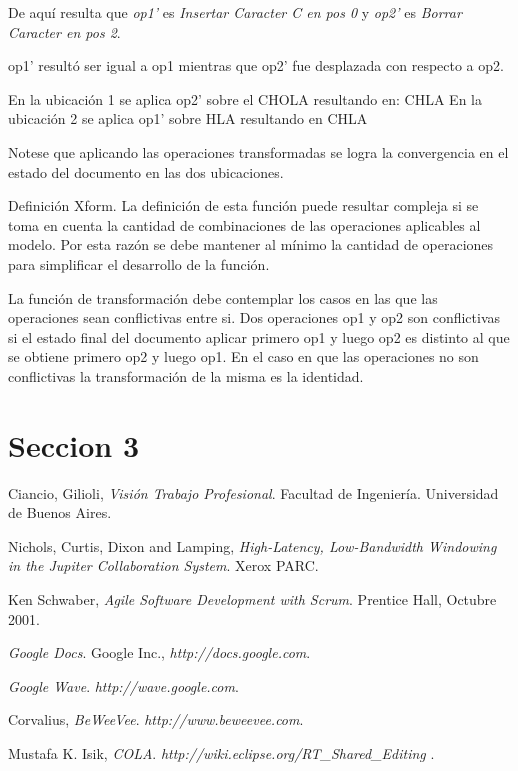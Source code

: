\documentclass[12pt,a4paper]{article}
\begin{document}
	De aquí resulta que \textit{op1’} es \textit{Insertar Caracter C en pos 0} y \textit{op2’} es 
	\textit{Borrar Caracter en pos 2}.

op1’ resultó ser igual a op1 mientras que op2’ fue desplazada con respecto a op2.

En la ubicación 1 se aplica op2’ sobre el CHOLA resultando en: CHLA
En la ubicación 2 se aplica op1’ sobre HLA resultando en CHLA

Notese que aplicando las operaciones transformadas se logra la convergencia en el estado del documento en las dos ubicaciones.

Definición Xform.
La definición de esta función puede resultar compleja si se toma en cuenta la cantidad de combinaciones de las operaciones aplicables al modelo. Por esta razón se debe mantener al mínimo la cantidad de operaciones para simplificar el desarrollo de la función.

La función de transformación debe contemplar los casos en las que las operaciones sean conflictivas entre si. Dos operaciones op1 y op2 son conflictivas si el estado final del documento aplicar primero op1 y luego op2 es distinto al que se obtiene primero op2 y luego op1. En el caso en que las operaciones no son conflictivas la transformación de la misma es la identidad.

	\section{Seccion 3}

\newpage
\begin{thebibliography}{9}
	Ciancio, Gilioli,
	\emph{Visión Trabajo Profesional}.
	Facultad de Ingeniería.
	Universidad de Buenos Aires. 

	Nichols, Curtis, Dixon and Lamping,
	\emph{High-Latency, Low-Bandwidth Windowing in the Jupiter Collaboration System}.
	Xerox PARC.

	Ken Schwaber,
	\emph{Agile Software Development with Scrum}.
	Prentice Hall, 
	Octubre 2001.
	
	\emph{Google Docs}. 
	Google Inc., 
	\textsl{http://docs.google.com}.
	
	\emph{Google Wave}. 
	\textsl{http://wave.google.com}.

	Corvalius,
	\emph{BeWeeVee}. 
	\textsl{http://www.beweevee.com}.
	
	Mustafa K. Isik,
	\emph{COLA}. 
	\textsl{ http://wiki.eclipse.org/RT\_Shared\_Editing }.
		
\end{thebibliography}
\end{document}
